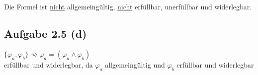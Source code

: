 \documentclass[12pt,a4paper]{article}
\begin{document}
Die Formel ist \underline{nicht} allgemeingültig, \underline{nicht} erfüllbar, unerfüllbar und widerlegbar.

\subsection*{Aufgabe 2.5 (d)}
$\lbrace\varphi_a,\varphi_b\rbrace\rightsquigarrow\varphi_d=(\varphi_a\wedge\varphi_b)$\\
erfüllbar und widerlegbar, da $\varphi_a$ allgemeingültig und $\varphi_b$ erfüllbar und widerlegbar
\end{document}
